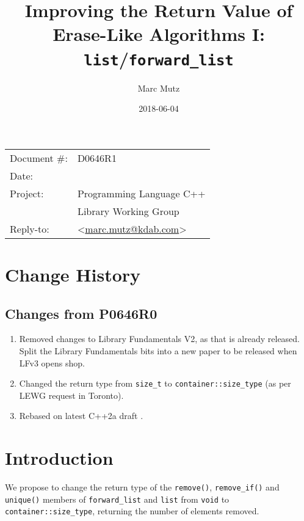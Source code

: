 \documentclass[11pt]{article}
\date{}
\title{Improving the Return Value of Erase-Like Algorithms I: \texttt{list}/\texttt{forward\_list}}
\makeatletter
\newcommand{\emailaddress}{marc.mutz@kdab.com}
\newcommand{\email}{\href{mailto:\emailaddress}{\emailaddress}}
\makeatother
\begin{document}
\maketitle\vspace{-2cm}

\begin{flushright}
  \begin{tabular}{ll}
  Document \#:&D0646R1\\
  Date:       &\date{2018-06-04}\\
  Project:    &Programming Language C++\\
              &Library Working Group\\
  Reply-to:   &\author{Marc Mutz} \textless\email\textgreater
  \end{tabular}
\end{flushright}

\section{Change History}

\subsection{Changes from P0646R0}

\begin{enumerate}
\item Removed changes to Library Fundamentals V2, as that is already
  released. Split the Library Fundamentals bits into a new paper to be
  released when LFv3 opens shop.
\item Changed the return type from \texttt{size\_t} to
  \texttt{container::size\_type} (as per LEWG request in Toronto).
\item Rebased on latest C++2a draft \cite{cpp}.
\end{enumerate}

\section{Introduction}

We propose to change the return type of the \texttt{remove()},
\texttt{remove\_if()} and \texttt{unique()} members of
\texttt{forward\_list} and \texttt{list} from \texttt{void} to
\texttt{container::size\_type}, returning the number of elements removed.
\end{document}

